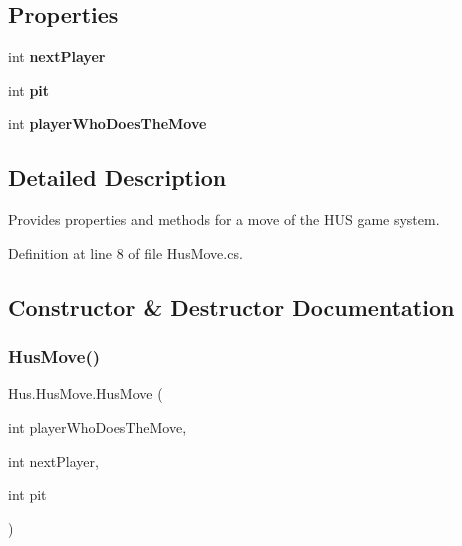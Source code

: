\subsection*{Properties}
\begin{DoxyCompactItemize}
\item 
\mbox{\label{class_hus_1_1_hus_move_a935e6906c622a72f35f59b2d6f5dfaac}} 
int {\bfseries next\+Player}
\item 
\mbox{\label{class_hus_1_1_hus_move_a0e65e0455f6ec5151e5aa50e1b442efd}} 
int {\bfseries pit}
\item 
\mbox{\label{class_hus_1_1_hus_move_ae5a6a7619fb4c28114ef8d2fe466ac72}} 
int {\bfseries player\+Who\+Does\+The\+Move}
\end{DoxyCompactItemize}


\subsection{Detailed Description}
Provides properties and methods for a move of the H\+US game system. 



Definition at line 8 of file Hus\+Move.\+cs.



\subsection{Constructor \& Destructor Documentation}
\mbox{\label{class_hus_1_1_hus_move_ad4b8bf3e479f52ac7eb4013a2fd8aba3}} 
\subsubsection{\texorpdfstring{Hus\+Move()}{HusMove()}}
{\footnotesize\ttfamily Hus.\+Hus\+Move.\+Hus\+Move (\begin{DoxyParamCaption}\item[{int}]{player\+Who\+Does\+The\+Move,  }\item[{int}]{next\+Player,  }\item[{int}]{pit }\end{DoxyParamCaption})}



